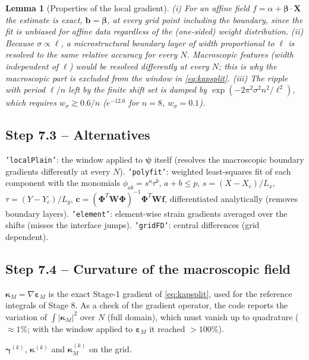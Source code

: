 \documentclass[11pt,a4paper]{article}
\newcommand{\epsM}{\bm{\varepsilon}_{M}}
\newcommand{\bpsi}{\bm{\psi}}
\newcommand{\bgam}{\bm{\gamma}}
\newcommand{\bkap}{\bm{\kappa}}
\newcommand{\bX}{\bm{X}}
\newcommand{\code}[1]{\texttt{#1}}
\theoremstyle{plain}
\newtheorem{lemma}{Lemma}
\theoremstyle{remark}
\begin{document}
\begin{lemma}[Properties of the local gradient]
\label{lem:mls}
(i) For an affine field $f=\alpha+\bm\beta\cdot\bX$ the estimate is exact, $\bm b=\bm\beta$, at
every grid point including the boundary, since the fit is unbiased for affine data regardless of
the (one-sided) weight distribution. (ii) Because $\sigma\propto\ell$, a microstructural boundary
layer of width proportional to $\ell$ is resolved to the same relative accuracy for every $N$.
Macroscopic features (width independent of $\ell$) would be resolved differently at every $N$;
this is why the macroscopic part is excluded from the window in \eqref{eq:kapsplit}.
(iii) The ripple with period $\ell/n$ left by the finite shift set is damped by
$\exp(-2\pi^2\sigma^2n^2/\ell^2)$, which requires $w_\sigma\gtrsim0.6/n$
($e^{-12.6}$ for $n=8$, $w_\sigma=0.1$).
\end{lemma}

\subsection*{Step 7.3 -- Alternatives}
\code{'localPlain'}: the window applied to $\bpsi$ itself (resolves the macroscopic boundary
gradients differently at every $N$). \code{'polyfit'}: weighted least-squares fit of each component with the monomials
$\phi_{ab}=s^a\tau^b$, $a+b\le p$, $s=(X-X_c)/L_x$, $\tau=(Y-Y_c)/L_y$,
$\bm c=(\bm\Phi^T\bm W\bm\Phi)^{-1}\bm\Phi^T\bm W\bm f$, differentiated analytically (removes
boundary layers). \code{'element'}: element-wise strain gradients averaged over the shifts
(misses the interface jumps). \code{'gridFD'}: central differences (grid dependent).

\subsection*{Step 7.4 -- Curvature of the macroscopic field}
$\bkap_M=\nabla\epsM$ is the exact Stage-1 gradient of \eqref{eq:kapsplit}, used for the reference
integrals of Stage 8. As a check of the gradient operator, the code reports the variation of
$\int|\bkap_M|^2$ over $N$ (full domain), which must vanish up to quadrature
($\approx1\%$; with the window applied to $\epsM$ it reached $>100\%$).
\begin{delivers}
$\bgam^{(k)}$, $\bkap^{(k)}$ and $\bkap_M^{(k)}$ on the grid.
\end{delivers}

\end{document}
